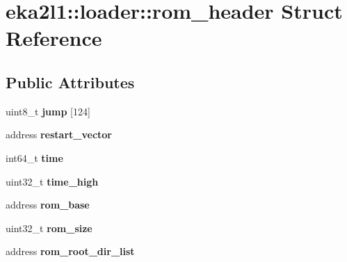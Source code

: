 \hypertarget{structeka2l1_1_1loader_1_1rom__header}{}\section{eka2l1\+:\+:loader\+:\+:rom\+\_\+header Struct Reference}
\label{structeka2l1_1_1loader_1_1rom__header}
\subsection*{Public Attributes}
\begin{DoxyCompactItemize}
\item 
\mbox{\label{structeka2l1_1_1loader_1_1rom__header_af61093b5c82c9c906c1eabfea1b21b58}} 
uint8\+\_\+t {\bfseries jump} \mbox{[}124\mbox{]}
\item 
\mbox{\label{structeka2l1_1_1loader_1_1rom__header_a1f44e39f307b3e6a1a01de9154216fc7}} 
address {\bfseries restart\+\_\+vector}
\item 
\mbox{\label{structeka2l1_1_1loader_1_1rom__header_ab851a07ff9228d2f06b1fe0fb864aacc}} 
int64\+\_\+t {\bfseries time}
\item 
\mbox{\label{structeka2l1_1_1loader_1_1rom__header_a040edf4c9571a2f0972fa737e28a033e}} 
uint32\+\_\+t {\bfseries time\+\_\+high}
\item 
\mbox{\label{structeka2l1_1_1loader_1_1rom__header_aa569c8af3675900e16cae8d7c4c0d155}} 
address {\bfseries rom\+\_\+base}
\item 
\mbox{\label{structeka2l1_1_1loader_1_1rom__header_a7d20fb3861f7f19ca94bed418136e2c4}} 
uint32\+\_\+t {\bfseries rom\+\_\+size}
\item 
\mbox{\label{structeka2l1_1_1loader_1_1rom__header_aa1c76dd39517023ec5570f17aa05e76d}} 
address {\bfseries rom\+\_\+root\+\_\+dir\+\_\+list}
\item 
\mbox{\label{structeka2l1_1_1loader_1_1rom__header_af57856b268e1f2282bd9aba46236760f}} 

\end{DoxyCompactItemize}
